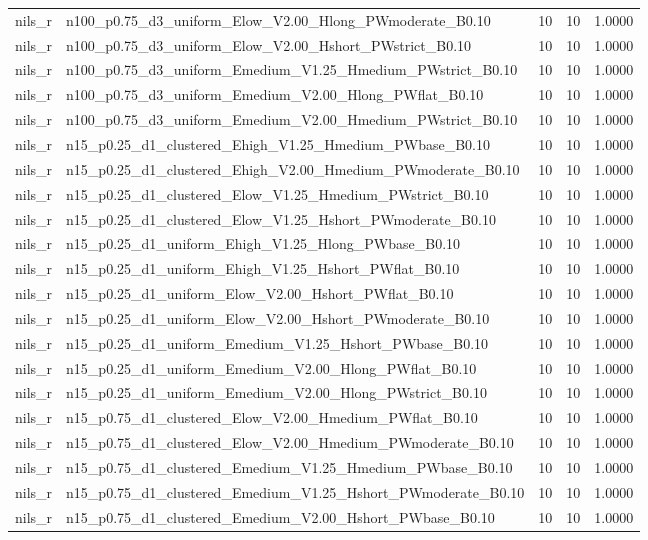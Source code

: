 \begin{tabular}{llrrr}
nils_r & n100_p0.75_d3_uniform_Elow_V2.00_Hlong_PWmoderate_B0.10 & 10 & 10 & 1.0000 \\
nils_r & n100_p0.75_d3_uniform_Elow_V2.00_Hshort_PWstrict_B0.10 & 10 & 10 & 1.0000 \\
nils_r & n100_p0.75_d3_uniform_Emedium_V1.25_Hmedium_PWstrict_B0.10 & 10 & 10 & 1.0000 \\
nils_r & n100_p0.75_d3_uniform_Emedium_V2.00_Hlong_PWflat_B0.10 & 10 & 10 & 1.0000 \\
nils_r & n100_p0.75_d3_uniform_Emedium_V2.00_Hmedium_PWstrict_B0.10 & 10 & 10 & 1.0000 \\
nils_r & n15_p0.25_d1_clustered_Ehigh_V1.25_Hmedium_PWbase_B0.10 & 10 & 10 & 1.0000 \\
nils_r & n15_p0.25_d1_clustered_Ehigh_V2.00_Hmedium_PWmoderate_B0.10 & 10 & 10 & 1.0000 \\
nils_r & n15_p0.25_d1_clustered_Elow_V1.25_Hmedium_PWstrict_B0.10 & 10 & 10 & 1.0000 \\
nils_r & n15_p0.25_d1_clustered_Elow_V1.25_Hshort_PWmoderate_B0.10 & 10 & 10 & 1.0000 \\
nils_r & n15_p0.25_d1_uniform_Ehigh_V1.25_Hlong_PWbase_B0.10 & 10 & 10 & 1.0000 \\
nils_r & n15_p0.25_d1_uniform_Ehigh_V1.25_Hshort_PWflat_B0.10 & 10 & 10 & 1.0000 \\
nils_r & n15_p0.25_d1_uniform_Elow_V2.00_Hshort_PWflat_B0.10 & 10 & 10 & 1.0000 \\
nils_r & n15_p0.25_d1_uniform_Elow_V2.00_Hshort_PWmoderate_B0.10 & 10 & 10 & 1.0000 \\
nils_r & n15_p0.25_d1_uniform_Emedium_V1.25_Hshort_PWbase_B0.10 & 10 & 10 & 1.0000 \\
nils_r & n15_p0.25_d1_uniform_Emedium_V2.00_Hlong_PWflat_B0.10 & 10 & 10 & 1.0000 \\
nils_r & n15_p0.25_d1_uniform_Emedium_V2.00_Hlong_PWstrict_B0.10 & 10 & 10 & 1.0000 \\
nils_r & n15_p0.75_d1_clustered_Elow_V2.00_Hmedium_PWflat_B0.10 & 10 & 10 & 1.0000 \\
nils_r & n15_p0.75_d1_clustered_Elow_V2.00_Hmedium_PWmoderate_B0.10 & 10 & 10 & 1.0000 \\
nils_r & n15_p0.75_d1_clustered_Emedium_V1.25_Hmedium_PWbase_B0.10 & 10 & 10 & 1.0000 \\
nils_r & n15_p0.75_d1_clustered_Emedium_V1.25_Hshort_PWmoderate_B0.10 & 10 & 10 & 1.0000 \\
nils_r & n15_p0.75_d1_clustered_Emedium_V2.00_Hshort_PWbase_B0.10 & 10 & 10 & 1.0000 \\

\end{tabular}
